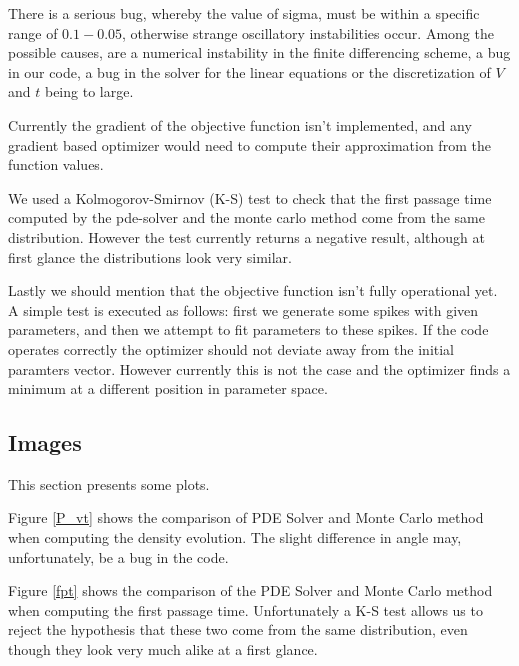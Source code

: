 \documentclass[10pt]{article}
\begin{document}
There is a serious bug, whereby the value of sigma,
must be within a specific range of $0.1 - 0.05$, otherwise strange
oscillatory instabilities occur. Among the possible causes, are a
numerical instability in the finite differencing scheme, a bug in our
code, a bug in the solver for the linear equations or the
discretization of $V$ and $t$ being to large. 

Currently the gradient of the objective function isn't implemented,
and any gradient based optimizer would need to compute their
approximation from the function values. 

We used a Kolmogorov-Smirnov (K-S) test to check that the first
passage time computed by the pde-solver and the monte carlo method
come from the same distribution. However the test currently returns a
negative result, although at first glance the distributions look very
similar. 

Lastly we should mention that the objective function isn't fully
operational yet. A simple test is executed as follows: first we
generate some spikes with given parameters, and then we attempt to fit
parameters to these spikes. If the code operates correctly the
optimizer should not deviate away from the initial paramters vector.
However currently this is not the case and the optimizer finds a
minimum at a different position in parameter space.

\subsection{Images}

This section presents some plots.

Figure \ref{P_vt} shows the comparison of PDE Solver and Monte Carlo
method when computing the density evolution. The slight difference in angle may,
unfortunately, be a bug in the code.

Figure \ref{fpt} shows the comparison of the PDE Solver and Monte
Carlo method when computing the first passage time. Unfortunately a
K-S test allows us to reject the hypothesis that these two come from
the same distribution, even though they look very much alike at a
first glance.
\end{document}
